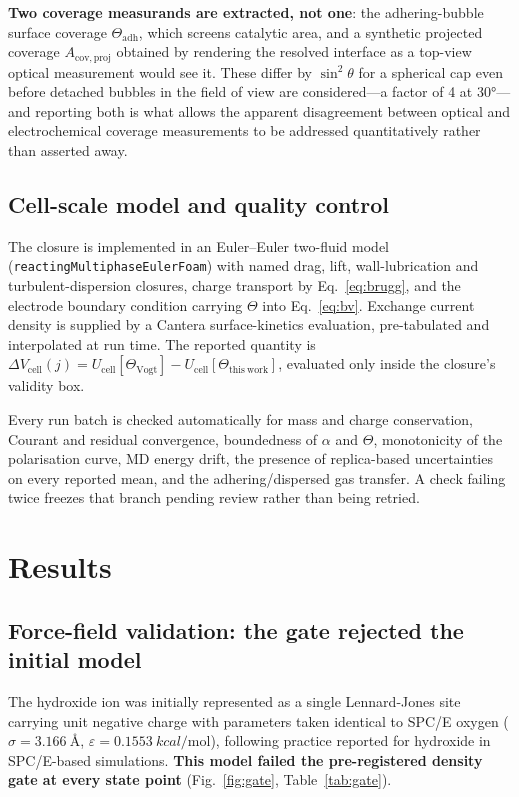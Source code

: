 \documentclass[11pt,a4paper]{article}
\begin{document}
\textbf{Two coverage measurands are extracted, not one}: the adhering-bubble surface coverage
$\Theta_{\mathrm{adh}}$, which screens catalytic area, and a synthetic projected coverage
$A_{\mathrm{cov,proj}}$ obtained by rendering the resolved interface as a top-view optical
measurement would see it. These differ by $\sin^2\theta$ for a spherical cap even before detached
bubbles in the field of view are considered---a factor of 4 at \ang{30}---and reporting both is what
allows the apparent disagreement between optical and electrochemical coverage measurements to be
addressed quantitatively rather than asserted away.

\subsection{Cell-scale model and quality control}
The closure is implemented in an Euler--Euler two-fluid model
(\texttt{reactingMultiphaseEulerFoam}) with named drag, lift, wall-lubrication and
turbulent-dispersion closures, charge transport by Eq.~\eqref{eq:brugg}, and the electrode boundary
condition carrying $\Theta$ into Eq.~\eqref{eq:bv}. Exchange current density is supplied by a Cantera
surface-kinetics evaluation, pre-tabulated and interpolated at run time. The reported quantity is
$\Delta V_{\mathrm{cell}}(j) = U_{\mathrm{cell}}[\Theta_{\mathrm{Vogt}}]
- U_{\mathrm{cell}}[\Theta_{\mathrm{this\ work}}]$, evaluated only inside the closure's validity box.

Every run batch is checked automatically for mass and charge conservation, Courant and residual
convergence, boundedness of $\alpha$ and $\Theta$, monotonicity of the polarisation curve, MD energy
drift, the presence of replica-based uncertainties on every reported mean, and the adhering/dispersed
gas transfer. A check failing twice freezes that branch pending review rather than being retried.

\section{Results}\label{sec:results}

\subsection{Force-field validation: the gate rejected the initial model}\label{sec:res-gate}

The hydroxide ion was initially represented as a single Lennard-Jones site carrying unit negative
charge with parameters taken identical to SPC/E oxygen
($\sigma=\SI{3.166}{\angstrom}$, $\varepsilon=\SI{0.1553}{kcal\per\mole}$), following practice
reported for hydroxide in SPC/E-based simulations. \textbf{This model failed the pre-registered
density gate at every state point} (Fig.~\ref{fig:gate}, Table~\ref{tab:gate}).
\end{document}
